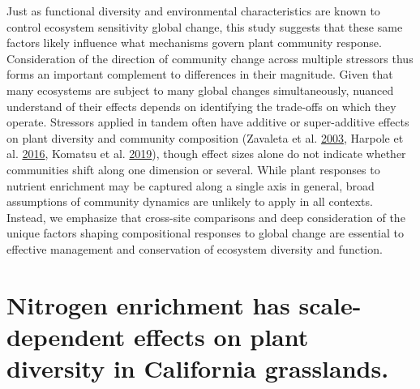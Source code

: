 \documentclass[twoside,12pt,final]{ucthesis-CA2012}
\begin{document}
\begin{ucmainmatter}
Just as functional diversity and environmental characteristics are known to control ecosystem sensitivity global change, this study suggests that these same factors likely influence what mechanisms govern plant community response. Consideration of the direction of community change across multiple stressors thus forms an important complement to differences in their magnitude. Given that many ecosystems are subject to many global changes simultaneously, nuanced understand of their effects depends on identifying the trade-offs on which they operate. Stressors applied in tandem often have additive or super-additive effects on plant diversity and community composition (Zavaleta et al. \protect\hyperlink{ref-Zavaleta2003}{2003}, Harpole et al. \protect\hyperlink{ref-Harpole2016}{2016}, Komatsu et al. \protect\hyperlink{ref-Komatsu2019}{2019}), though effect sizes alone do not indicate whether communities shift along one dimension or several. While plant responses to nutrient enrichment may be captured along a single axis in general, broad assumptions of community dynamics are unlikely to apply in all contexts. Instead, we emphasize that cross-site comparisons and deep consideration of the unique factors shaping compositional responses to global change are essential to effective management and conservation of ecosystem diversity and function.

\hypertarget{nitrogen-enrichment-has-scale-dependent-effects-on-plant-diversity-in-california-grasslands.}{%
\chapter{Nitrogen enrichment has scale-dependent effects on plant diversity in California grasslands.}\label{nitrogen-enrichment-has-scale-dependent-effects-on-plant-diversity-in-california-grasslands.}}



\end{ucmainmatter}
\end{document}
